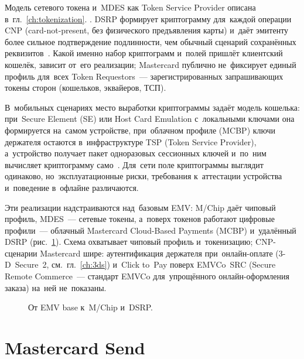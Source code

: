 Модель сетевого токена и~MDES как Token Service Provider описана
в~гл.~\ref{ch:tokenization}. . DSRP формирует криптограмму для~каждой
операции CNP (card-not-present, без физического предъявления карты) и~даёт
эмитенту более сильное подтверждение подлинности, чем обычный сценарий
сохранённых реквизитов~\cite{mc-mdes-token-connect}. Какой именно набор
криптограмм и~полей пришлёт клиентский кошелёк, зависит от~его реализации;
Mastercard публично не~фиксирует единый профиль для~всех Token Requestors~---
зарегистрированных запрашивающих токены сторон (кошельков, эквайеров, ТСП).

В~мобильных сценариях место выработки криптограммы задаёт модель кошелька:
при~Secure Element (SE) или Host Card Emulation с~локальными ключами она
формируется на~самом устройстве, при~облачном профиле (MCBP) ключи держателя остаются в~инфраструктуре TSP
(Token Service Provider), а~устройство получает пакет одноразовых сессионных
ключей и~по~ним вычисляет криптограмму само~\cite{bostonfed-hce-2016}.
Для~сети поле криптограммы выглядит одинаково, но~эксплуатационные риски,
требования к~аттестации устройства и~поведение в~офлайне различаются.

Эти реализации надстраиваются над~базовым EMV: M/Chip даёт чиповый профиль, MDES~---
сетевые токены, а~поверх токенов работают цифровые профили~--- облачный
Mastercard Cloud-Based Payments (MCBP) и~удалённый DSRP
(рис.~\ref{fig:mchip-dsrp-layers}). Схема охватывает чиповый профиль
и~токенизацию; CNP-сценарии Mastercard шире: аутентификация держателя
при~онлайн-оплате (3-D~Secure~2, см.~гл.~\ref{ch:3ds}) и~Click to~Pay
поверх EMVCo~SRC (Secure Remote Commerce~--- стандарт EMVCo для~упрощённого
онлайн-оформления заказа) на~ней не~показаны.

\begin{figure}[tbp]
  \centering
  \caption{От EMV base к~M/Chip и~DSRP.}\label{fig:mchip-dsrp-layers}
\end{figure}
\FloatBarrier

\section{Mastercard Send}\label{sec:mc-send}

